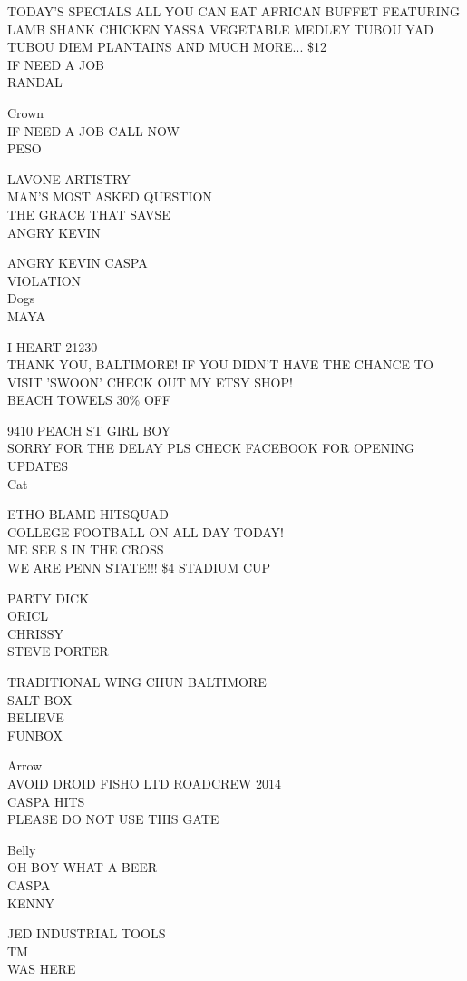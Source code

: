 \documentclass[10pt,letterpaper]{article}
\begin{document}
TODAY'S SPECIALS ALL YOU CAN EAT AFRICAN BUFFET FEATURING LAMB SHANK CHICKEN YASSA VEGETABLE MEDLEY TUBOU YAD TUBOU DIEM PLANTAINS AND MUCH MORE... \$12\\
IF NEED A JOB\\
RANDAL

Crown\\
IF NEED A JOB CALL NOW\\
PESO

LAVONE ARTISTRY\\
MAN'S MOST ASKED QUESTION\\
THE GRACE THAT SAVSE\\
ANGRY KEVIN

ANGRY KEVIN CASPA\\
VIOLATION\\
Dogs\\
MAYA

I HEART 21230\\
THANK YOU, BALTIMORE!  IF YOU DIDN'T HAVE THE CHANCE TO VISIT 'SWOON' CHECK OUT MY ETSY SHOP!\\
BEACH TOWELS 30\% OFF

9410 PEACH ST GIRL BOY\\
SORRY FOR THE DELAY PLS CHECK FACEBOOK FOR OPENING UPDATES\\
Cat

ETHO BLAME HITSQUAD\\
COLLEGE FOOTBALL ON ALL DAY TODAY!\\
ME SEE S IN THE CROSS\\
WE ARE PENN STATE!!! \$4 STADIUM CUP

PARTY DICK\\
ORICL\\
CHRISSY\\
STEVE PORTER

TRADITIONAL WING CHUN BALTIMORE\\
SALT BOX\\
BELIEVE\\
FUNBOX

Arrow\\
AVOID DROID FISHO LTD ROADCREW 2014\\
CASPA HITS\\
PLEASE DO NOT USE THIS GATE

Belly\\
OH BOY WHAT A BEER\\
CASPA\\
KENNY

JED INDUSTRIAL TOOLS\\
TM\\
WAS HERE
\end{document}
